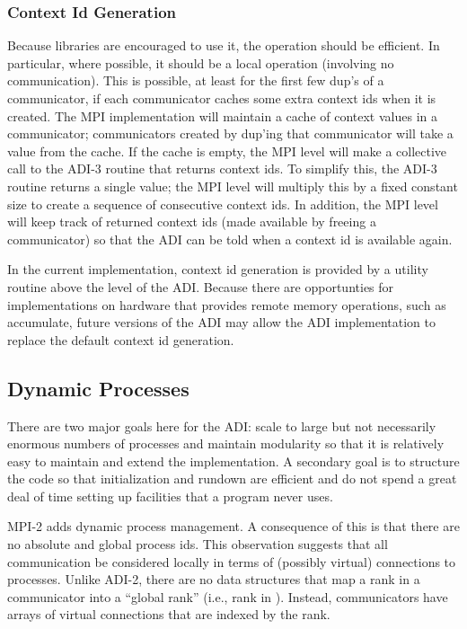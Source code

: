 {\subsubsection{Context Id Generation}
\label{sec:context-id-generation}
Because libraries are encouraged to use it, the operation
 should be efficient.  In particular, 
where possible, it should be a local operation (involving no
communication).  This is possible, at least for the first few dup's of
a communicator, if each communicator caches some extra context ids
when it is created.  The MPI implementation will maintain a cache of
context values in a communicator; communicators created by dup'ing
that communicator will take a value from the cache.  If the cache is
empty, the MPI level will make a collective call to the ADI-3 routine
that returns context ids.  To simplify this, the ADI-3 routine returns
a single value; the MPI level will multiply this by a fixed constant
size to create a sequence of consecutive context ids.  In addition,
the MPI level will keep track of returned context ids (made available
by freeing a communicator) so that the ADI can be told when a context
id is available again.

In the current implementation, context id generation is provided by a
utility routine above the level of the ADI.  Because there are opportunties
for implementations on hardware that provides remote memory operations,
such as accumulate, future versions of the ADI may allow the ADI
implementation to replace the default context id generation.

\subsection{Dynamic Processes}
There are two major goals here for the ADI:  scale to large but not
necessarily enormous numbers of processes and maintain modularity so
that it is relatively easy to maintain and extend the implementation.
A secondary goal is to structure the code so that initialization and
rundown are efficient and do not spend a great deal of time setting up
facilities that a program never uses.

MPI-2 adds dynamic process management.  A consequence of this is that
there are no absolute and global process ids.  This observation
suggests that all communication be considered locally in terms of
(possibly virtual) connections to processes.  Unlike ADI-2, there are
no data structures that map a rank in a communicator into a ``global
rank'' (i.e., rank in ).  Instead, communicators
have arrays of virtual connections that are indexed by the rank.

}
